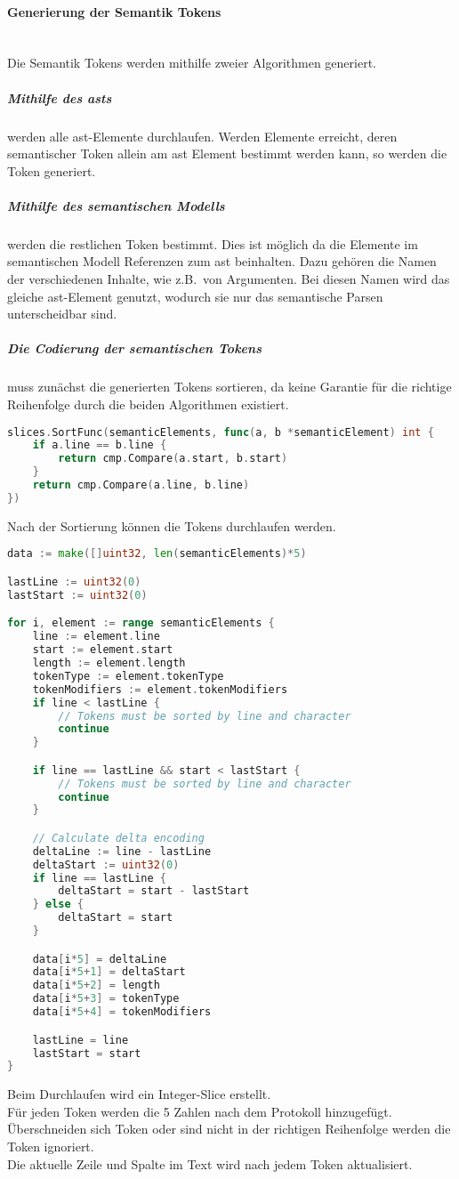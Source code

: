 \documentclass[./einleitung.tex]{subfiles}
\begin{document}
    \paragraph{Generierung der Semantik Tokens}\mbox{}\\
    Die Semantik Tokens werden mithilfe zweier Algorithmen generiert.
    \subparagraph{Mithilfe des \acrshort{ast}s} werden alle \acrshort{ast}-Elemente durchlaufen.
    Werden Elemente erreicht, deren semantischer Token allein am \acrshort{ast} Element bestimmt werden kann, so werden die Token generiert.
    \subparagraph{Mithilfe des semantischen Modells} werden die restlichen Token bestimmt.
    Dies ist möglich da die Elemente im semantischen Modell Referenzen zum \acrshort{ast} beinhalten.
    Dazu gehören die Namen der verschiedenen Inhalte, wie z.B.\ von Argumenten.
    Bei diesen Namen wird das gleiche \acrshort{ast}-Element genutzt, wodurch sie nur das semantische Parsen unterscheidbar sind.

    \subparagraph{Die Codierung der semantischen Tokens} muss zunächst die generierten Tokens sortieren, da keine Garantie für die richtige Reihenfolge durch die beiden Algorithmen existiert.
    \begin{lstlisting}[language=Go,label={lst:sortSemanticTokens}]
slices.SortFunc(semanticElements, func(a, b *semanticElement) int {
    if a.line == b.line {
        return cmp.Compare(a.start, b.start)
    }
    return cmp.Compare(a.line, b.line)
})
    \end{lstlisting}
    Nach der Sortierung können die Tokens durchlaufen werden.
    \begin{lstlisting}[language=Go]
data := make([]uint32, len(semanticElements)*5)

lastLine := uint32(0)
lastStart := uint32(0)

for i, element := range semanticElements {
    line := element.line
    start := element.start
    length := element.length
    tokenType := element.tokenType
    tokenModifiers := element.tokenModifiers
    if line < lastLine {
        // Tokens must be sorted by line and character
        continue
    }

    if line == lastLine && start < lastStart {
        // Tokens must be sorted by line and character
        continue
    }

    // Calculate delta encoding
    deltaLine := line - lastLine
    deltaStart := uint32(0)
    if line == lastLine {
        deltaStart = start - lastStart
    } else {
        deltaStart = start
    }

    data[i*5] = deltaLine
    data[i*5+1] = deltaStart
    data[i*5+2] = length
    data[i*5+3] = tokenType
    data[i*5+4] = tokenModifiers

    lastLine = line
    lastStart = start
}
    \end{lstlisting}
    Beim Durchlaufen wird ein Integer-Slice erstellt. \\
    Für jeden Token werden die 5 Zahlen nach dem Protokoll hinzugefügt. \\
    Überschneiden sich Token oder sind nicht in der richtigen Reihenfolge werden die Token ignoriert. \\
    Die aktuelle Zeile und Spalte im Text wird nach jedem Token aktualisiert.
\end{document}
